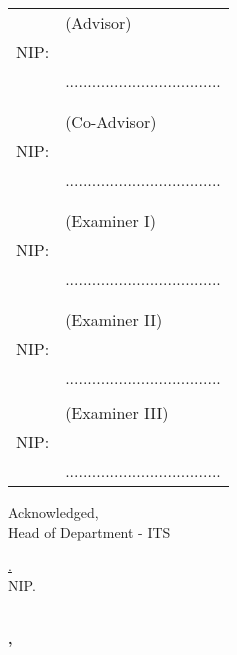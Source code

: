 \noindent
\begin{tabularx}{\textwidth}{X l}
  \advisor{}               & (Advisor)                           \\
  NIP: \advisornip{}       &                                     \\
                           & ................................... \\
                           &                                     \\
                           &                                     \\
  \coadvisor{}             & (Co-Advisor)                        \\
  NIP: \coadvisornip{}     &                                     \\
                           & ................................... \\
                           &                                     \\
                           &                                     \\
  \examinerone{}           & (Examiner I)                        \\
  NIP:  \examineronenip{}  &                                     \\
                           & ................................... \\
                           &                                     \\
                           &                                     \\
  \examinertwo{}           & (Examiner II)                       \\
  NIP:  \examinertwonip{}  &                                     \\
                           & ................................... \\
                           &                                     \\
  \examinerthree{}         & (Examiner III)                      \\
  NIP:  \examinerthreenip{}&                                     \\
                           & ................................... \\  
\end{tabularx}
\endgroup

\begin{center}
  Acknowledged, \\
  Head of \engdepartment{} Department \engfacultyshort{} - ITS \\
  
  \vspace{8ex}
  
  \underline{\headofdepartment{}.} \\
  NIP. \headofdepartmentnip{}
\end{center}

\begin{center}
  \textbf{\MakeUppercase{\place{}}\\\ENGMONTH{}, \the\year{}}
\end{center}
\endgroup